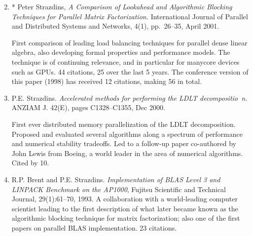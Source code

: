 \documentclass[a4paper,oneside,12pt]{article}
\begin{document}
\begin{enumerate}
\setcounter{enumi}{1}

\item * {Peter Strazdins}, 
	{\em A Comparison of Lookahead and {A}lgorithmic {B}locking
      Techniques for {P}arallel {M}atrix {F}actorization.} 
	International Journal of Parallel and Distributed Systems and
      Networks, 4(1), pp.\ 26--35, April 2001. 

First comparison of leading load balancing techniques for parallel
dense linear algebra, also developing formal properties and
performance models. The technique is of continuing relevance, and in
particular for manycore devices such as GPUs. 44 citations, 25 over
the last 5 years. The conference version of this paper (1998) has received
12 citations, making 56 in total.


\item P.E. Strazdins.
                {\em Accelerated methods for performing the {LDLT} decompositio\
n.}
                {ANZIAM J.} 42(E), pages C1328--C1355, Dec 2000.

First ever distributed memory parallelization of the LDLT
decomposition.  Proposed and evaluated several algorithms along a
spectrum of performance and numerical stability tradeoffs. Led to a
follow-up paper co-authored by John Lewis from Boeing, a world leader
in the area of numerical algorithms. Cited by 10.

\item R.P. Brent and P.E. Strazdins. {\em Implementation of BLAS Level
  3 and LINPACK Benchmark on the AP1000}, Fujitsu Scientific and
  Technical Journal, 29(1):61–70, 1993.  A collaboration with a
  world-leading computer scientist leading to the first description of
  what later became known as the algorithmic blocking technique for
  matrix factorization; also one of the first papers on parallel BLAS
  implementation. 23 citations.

\end{enumerate}
\end{document}
